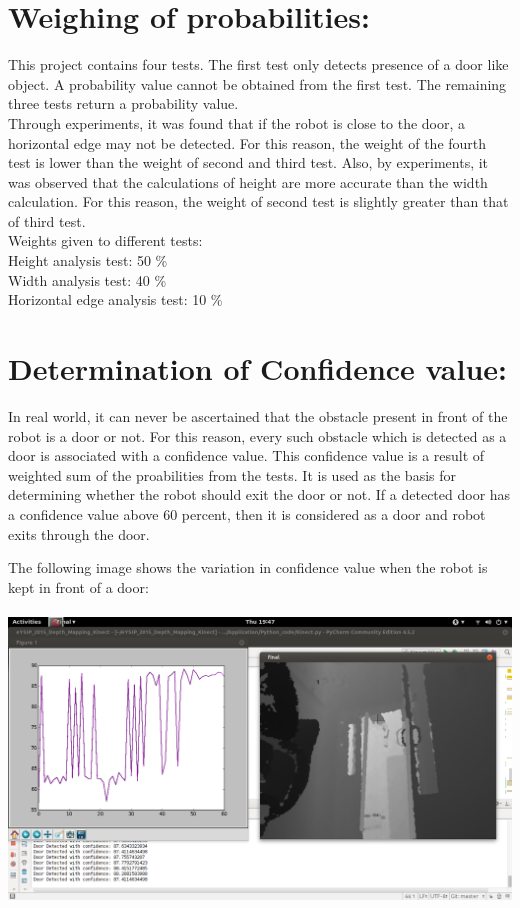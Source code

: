 \documentclass{report}
\begin{document}
\section{Weighing of probabilities:}

This project contains four tests. The first test only detects presence of a door like object. A probability
value cannot be obtained from the first test. The remaining three tests return a probability value.\\
Through experiments, it was found that
if the robot is close to the door, a horizontal edge may not be detected. For this reason, the weight of the fourth test is lower than the weight of second and third test.
Also, by experiments, it was observed that the calculations of height are more accurate than the width calculation. For this reason, the weight of
second test is slightly greater than that of third test.\\
Weights given to  different tests:\\
Height analysis test: 50 \% \\
Width analysis test: 40 \% \\
Horizontal edge analysis test: 10 \% \\
\section{Determination of Confidence value:}
In real world, it can never be ascertained that the obstacle present in front of
the robot is a door or not. For this reason, every such obstacle which is detected as a door is associated with a confidence
value. This confidence value is a result of weighted sum of the proabilities from the tests. It is used as the basis for determining whether the robot
should exit the door or not. If a detected door has a confidence value above 60 percent, then it is considered as a door and robot
exits through the door.
\pagebreak

The following image shows the variation in confidence value when the robot is kept in front of a door: \\ \\
\includegraphics[width = 15cm]{graph_2.png} \\
\end{document}

